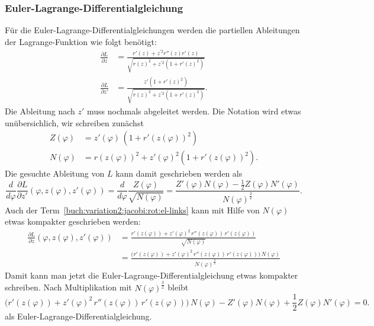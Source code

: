 \subsubsection{Euler-Lagrange-Differentialgleichung}
Für die Euler-Lagrange-Differentialgleichungen werden die partiellen
Ableitungen der Lagrange-Funktion wie folgt benötigt:
\begin{align}
\frac{\partial L}{\partial z}
&=
\frac{
r'(z) + z^{\prime 2}r''(z)r'(z)
}{
\sqrt{r(z)^2 + z^{\prime 2}(1+r'(z)^2)}
}
\label{buch:variation2:jacobi:rot:el-links}
\\
\frac{\partial L}{\partial z'}
&=
\frac{
z'(1+r'(z)^2)
}{
\sqrt{r(z)^2 + z^{\prime 2}(1+r'(z)^2)}
}.
\end{align}
Die Ableitung nach $z'$ muss nochmals abgeleitet werden.
Die Notation wird etwas unübersichlich, wir schreiben zunächst
\begin{align*}
Z(\varphi)
&=
z'(\varphi)\,(1+r'(z(\varphi))^2)
\\
N(\varphi)
&=
r(z(\varphi))^2
+
z'(\varphi)^2 (1+r'(z(\varphi))^2).
\end{align*}
Die gesuchte Ableitung von $L$ kann damit geschrieben werden als
\begin{equation}
\frac{d}{d\varphi}\frac{\partial L}{\partial z'}
(\varphi,z(\varphi),z'(\varphi))
=
\frac{d}{d\varphi}\frac{Z(\varphi)}{\sqrt{N(\varphi)}}
=
\frac{
Z'(\varphi)N(\varphi)
-
\frac12
Z(\varphi)N'(\varphi)
}{
N(\varphi)^{\frac32}
}.
\label{buch:variation2:jacobi:eqn:el2}
\end{equation}
Auch der Term~\eqref{buch:variation2:jacobi:rot:el-links}
kann mit Hilfe von $N(\varphi)$ etwas kompakter geschrieben werden:
\begin{align*}
\frac{\partial L}{\partial z}
(\varphi,z(\varphi),z'(\varphi))
&=
\frac{
r'(z(\varphi)) + z'(\varphi)^2\,r''(z(\varphi))\,r'(z(\varphi))
}{\sqrt{N(\varphi)}}
\\
&=
\frac{
\bigl(r'(z(\varphi)) + z'(\varphi)^2\,r''(z(\varphi))\,r'(z(\varphi))\bigr)
\,
N(\varphi)
}{
N(\varphi)^{\frac32}
}
\end{align*}
Damit kann man jetzt die Euler-Lagrange-Differentialgleichung etwas
kompakter schreiben.
Nach Multiplikation mit $N(\varphi)^{\frac32}$ bleibt
\begin{equation}
\bigl(
r'(z(\varphi)) + z'(\varphi)^2\,r''(z(\varphi))\,r'(z(\varphi))
\bigr)
\,
N(\varphi)
-
Z'(\varphi)N(\varphi) + \frac12 Z(\varphi)N'(\varphi)=0.
\label{buch:variation2:jacobi:el-ZN}
\end{equation}
als Euler-Lagrange-Differentialgleichung.

